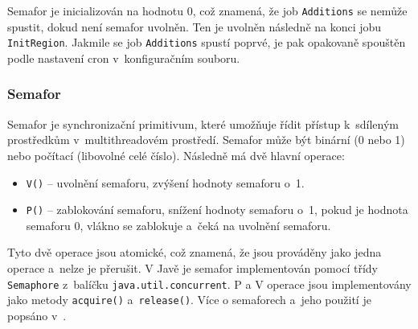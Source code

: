 Semafor je inicializován na hodnotu 0, což znamená, že job \texttt{Additions}
se nemůže spustit, dokud není semafor uvolněn. Ten je uvolněn následně na konci
jobu \texttt{InitRegion}. Jakmile se job \texttt{Additions} spustí poprvé, je pak
opakovaně spouštěn podle nastavení cron v~konfiguračním souboru.

\subsubsection*{Semafor}
Semafor je synchronizační primitivum, které umožňuje řídit přístup
k~sdíleným prostředkům v~multithreadovém prostředí.
Semafor může být binární (0 nebo 1) nebo počítací (libovolné celé číslo).
Následně má dvě hlavní operace:
\begin{itemize}
    \item \texttt{V()} -- uvolnění semaforu, zvýšení hodnoty semaforu o~1.
    \item \texttt{P()} -- zablokování semaforu, snížení hodnoty semaforu o~1, pokud je hodnota semaforu 0, vlákno se zablokuje a~čeká na uvolnění semaforu.
\end{itemize}

Tyto dvě operace jsou atomické, což znamená, že jsou prováděny jako jedna operace a~nelze je přerušit.
V Javě je semafor implementován pomocí třídy \texttt{Semaphore} z~balíčku \texttt{java.util.concurrent}.
P a V operace jsou implementovány jako metody \texttt{acquire()} a~\texttt{release()}.
Více o semaforech a~jeho použití je popsáno v~\cite{pesicka_semafor}.


